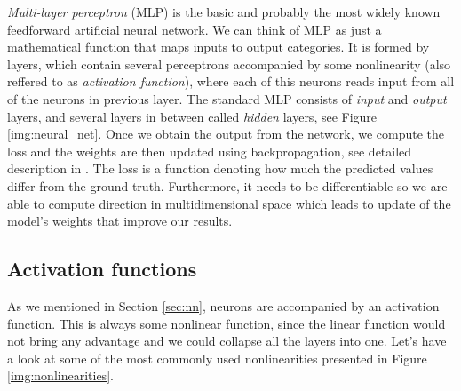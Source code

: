 \textit{Multi-layer perceptron} (MLP) is the basic and probably the most widely
known feedforward artificial neural network. We can think of MLP as just a mathematical
function that maps inputs to output categories. It is formed by layers, which contain
several perceptrons accompanied by some nonlinearity (also reffered to as
\textit{activation function}), where each of this
neurons reads input from all of the neurons in previous layer. The standard MLP consists
of \textit{input} and \textit{output} layers, and several layers in between called
\textit{hidden} layers, see Figure \ref{img:neural_net}. \cite{bib:goodfellow2016deep}
Once we obtain the output from the network, we compute
the loss and the weights are then updated using backpropagation, see detailed description in
\cite{bib:goodfellow2016deep}.
The loss is a function denoting how much the predicted values differ from the ground truth. Furthermore,
it needs to be differentiable so we are able to compute direction in
multidimensional space which leads to update of the model's weights that improve our results.

\subsection{Activation functions}
\label{sec:nn:activation_functions}

As we mentioned in Section \ref{sec:nn}, neurons are accompanied by an activation function.
This is always some nonlinear function, since the linear function would not bring any
advantage and we could collapse all the layers into one. Let's have a look at some of
the most commonly used nonlinearities presented in Figure \ref{img:nonlinearities}.

